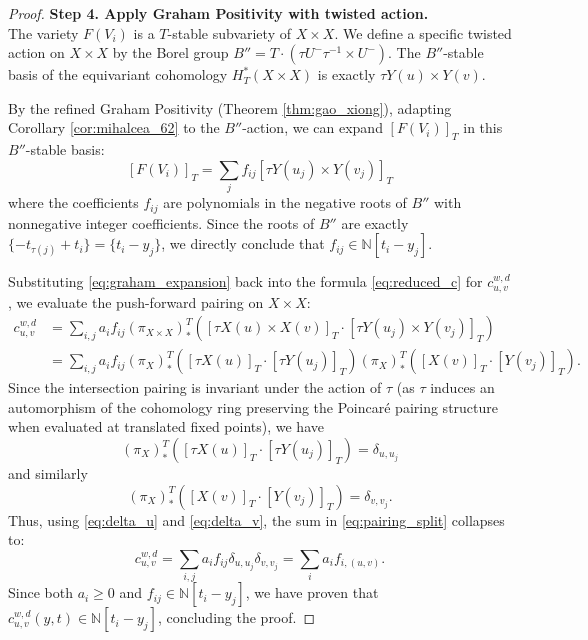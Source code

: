 \documentclass{amsart}
\theoremstyle{definition}
\begin{document}
\begin{proof}
\vspace{2mm}
\noindent \textbf{Step 4. Apply Graham Positivity with twisted action.}\\
The variety $F(V_i)$ is a $T$-stable subvariety of $X \times X$. We define a specific twisted action on $X \times X$ by the Borel group $B'' = T \cdot (\tau U^- \tau^{-1} \times U^-)$. The $B''$-stable basis of the equivariant cohomology $H_T^*(X \times X)$ is exactly $\tau Y(u) \times Y(v)$. 

By the refined Graham Positivity (Theorem \ref{thm:gao_xiong}), adapting Corollary \ref{cor:mihalcea_62} to the $B''$-action, we can expand $[F(V_i)]_T$ in this $B''$-stable basis:
\begin{equation}\label{eq:graham_expansion}
[F(V_i)]_T = \sum_j f_{ij} [\tau Y(u_j) \times Y(v_j)]_T 
\end{equation}
where the coefficients $f_{ij}$ are polynomials in the negative roots of $B''$ with nonnegative integer coefficients. Since the roots of $B''$ are exactly $\{ -t_{\tau(j)} + t_i \} = \{ t_i - y_j \}$, we directly conclude that $f_{ij} \in \mathbb{N}[t_i - y_j]$. 

Substituting \eqref{eq:graham_expansion} back into the formula \eqref{eq:reduced_c} for $c_{u,v}^{w,d}$, we evaluate the push-forward pairing on $X \times X$:
\begin{align}
c_{u,v}^{w,d} &= \sum_{i,j} a_i f_{ij} (\pi_{X \times X})_*^T \left( [\tau X(u) \times X(v)]_T \cdot [\tau Y(u_j) \times Y(v_j)]_T \right) \nonumber \\
&= \sum_{i,j} a_i f_{ij} (\pi_X)_*^T\left([\tau X(u)]_T \cdot [\tau Y(u_j)]_T\right) (\pi_X)_*^T\left([X(v)]_T \cdot [Y(v_j)]_T\right). \label{eq:pairing_split}
\end{align}
Since the intersection pairing is invariant under the action of $\tau$ (as $\tau$ induces an automorphism of the cohomology ring preserving the Poincar\'e pairing structure when evaluated at translated fixed points), we have
\begin{equation}\label{eq:delta_u}
(\pi_X)_*^T\left([\tau X(u)]_T \cdot [\tau Y(u_j)]_T\right) = \delta_{u, u_j} 
\end{equation}
and similarly
\begin{equation}\label{eq:delta_v}
(\pi_X)_*^T\left([X(v)]_T \cdot [Y(v_j)]_T\right) = \delta_{v, v_j}. 
\end{equation}
Thus, using \eqref{eq:delta_u} and \eqref{eq:delta_v}, the sum in \eqref{eq:pairing_split} collapses to:
\begin{equation}\label{eq:final_c}
c_{u,v}^{w,d} = \sum_{i,j} a_i f_{ij} \delta_{u, u_j} \delta_{v, v_j} = \sum_i a_i f_{i, (u,v)}. 
\end{equation}
Since both $a_i \ge 0$ and $f_{ij} \in \mathbb{N}[t_i - y_j]$, we have proven that $c_{u,v}^{w,d}(y,t) \in \mathbb{N}[t_i - y_j]$, concluding the proof.
\end{proof}
\end{document}
